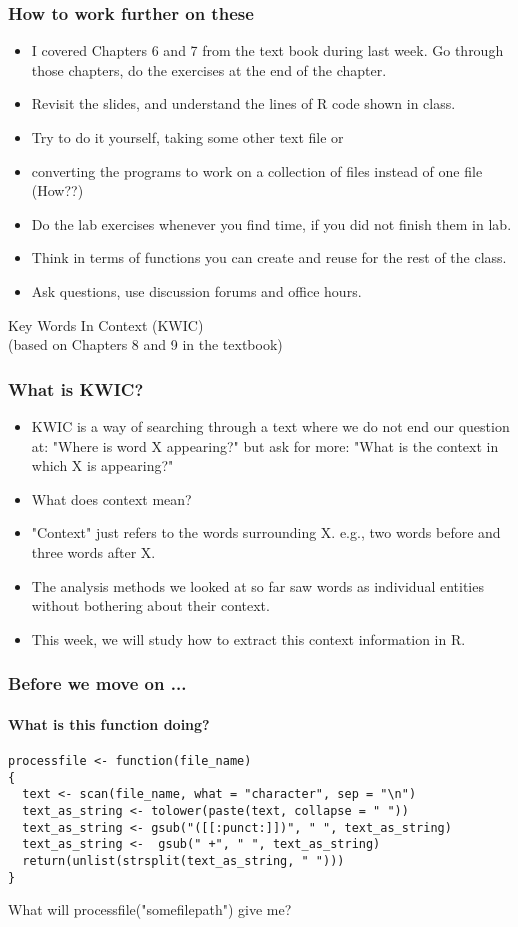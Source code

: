 \documentclass{beamer}
\begin{document}
\begin{frame}
\frametitle{How to work further on these}
\begin{itemize}
\item I covered Chapters 6 and 7 from the text book during last week. Go through those chapters, do the exercises at the end of the chapter.
\item Revisit the slides, and understand the lines of R code shown in class. 
\item Try to do it yourself, taking some other text file or 
\item converting the programs to work on a collection of files instead of one file (How??) 
\item Do the lab exercises whenever you find time, if you did not finish them in lab.
\item Think in terms of functions you can create and reuse for the rest of the class.
\item Ask questions, use discussion forums and office hours.
\end{itemize}
\end{frame}

\begin{frame}
\Large Key Words In Context (KWIC) \\
\footnotesize (based on Chapters 8 and 9 in the textbook)
\end{frame}

\begin{frame}
\frametitle{What is KWIC?}
\begin{itemize}
\item KWIC is a way of searching through a text where we do not end our question at: "Where is word X appearing?" but ask for more: "What is the context in which X is appearing?" 
\item What does context mean? \pause
\item "Context" just refers to the words surrounding X. e.g., two words before and three words after X. 
\item The analysis methods we looked at so far saw words as individual entities without bothering about their context.  
\item This week, we will study how to extract this context information in R.
\end{itemize}
\end{frame}

\begin{frame}[fragile]
\frametitle{Before we move on ... }
\framesubtitle{What is this function doing?}
\footnotesize
\begin{verbatim}
processfile <- function(file_name)
{
  text <- scan(file_name, what = "character", sep = "\n") 
  text_as_string <- tolower(paste(text, collapse = " "))
  text_as_string <- gsub("([[:punct:]])", " ", text_as_string)
  text_as_string <-  gsub(" +", " ", text_as_string)
  return(unlist(strsplit(text_as_string, " ")))
}
\end{verbatim}
What will processfile("somefilepath") give me?
\end{frame}
\end{document}
